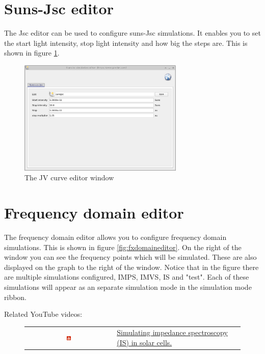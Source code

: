 \section{Suns-Jsc editor}
The Jsc editor can be used to configure suns-Jsc simulations. It enables you to set the start light intensity, stop light intensity and how big the steps are. This is shown in figure \ref{fig:sunsjsceditor}.

\begin{figure}[H]
\centering
\includegraphics[width=0.7\textwidth,height=0.5\textwidth]{./images/suns_jsc_editor.png}
\caption{The JV curve editor window}
\label{fig:sunsjsceditor}
\end{figure}


\section{Frequency domain editor}
The frequency domain editor allows you to configure frequency domain simulations. This is shown in figure \ref{fig:fxdomaineditor}. On the right of the window you can see the frequency points which will be simulated. These are also displayed on the graph to the right of the window.  Notice that in the figure there are multiple simulations configured, IMPS, IMVS, IS and "test".  Each of these simulations will appear as an separate simulation mode in the simulation mode ribbon.

Related YouTube videos:
\begin{figure}[H]

\begin{tabular}{ c l }

\includegraphics[width=0.05\textwidth]{./images/youtube.png}

&
\href{https://www.youtube.com/watch?v=NJAsZeiB5FU}{Simulating impedance spectroscopy (IS) in solar cells.}

\end{tabular}
\end{figure}


